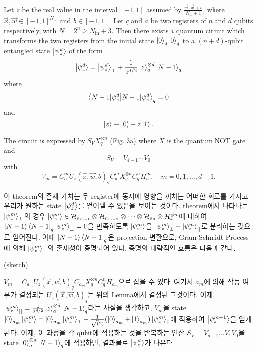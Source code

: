 \begin{theorem}
    
Let $z$ be the real value in the interval $[-1, 1]$ assumed by $\frac{\vec{w} \cdot \vec{x} + b}{N_{\text{in}} + 1}$, where $\vec{x}, \vec{w} \in [-1, 1]^{N_{\text{in}}}$ and $b \in [-1, 1]$. Let $q$ and $a$ be two registers of $n$ and $d$ qubits respectively, with $N = 2^n \geq N_{\text{in}} + 3$. Then there exists a quantum circuit which transforms the two registers from the initial state $\ket{0}_a \ket{0}_q$ to a $(n + d)$-qubit entangled state $\ket{\psi_z^d}$ of the form
\[
\ket{\psi_z^d} = \ket{\psi_z^d}_\perp + \frac{1}{2^{d/2}} \ket{z}_a^{\otimes d} \ket{N - 1}_q
\]
where
\[
\braket{N - 1 | \psi_z^d}_q = 0
\]
and
\[
\ket{z} \equiv \ket{0} + z \ket{1}.
\]

The circuit is expressed by $S_V X^{\otimes n}_q$ (Fig. 3a) where $X$ is the quantum NOT gate and
\[
S_V = V_{d-1} \cdots V_0
\]
with
\[
V_m = C_a^m U_z(\vec{x}, \vec{w}, b)_q C_a^m X_q^{\otimes n} C_q^n H_a^m, \quad m = 0, 1, \ldots, d - 1.
\]
\end{theorem}

이 theorem의 존재 가치는 두 register에 동시에 영향을 끼치는 어떠한 회로를 가지고 우리가 원하는 state \(\ket{\psi_z^d}\)를 얻어낼 수 있음을 보이는 것이다.
theorem에서 나타나는 \(\ket{\psi_z^m}_\perp\)의 경우
\(\ket{\psi_z^m} \in \mathcal{H}_{a_{m-1}} \otimes \mathcal{H}_{a_{m-2}} \otimes \dots \otimes \mathcal{H}_{a_{0}} \otimes \mathcal{H}_{a}^{\otimes n}\)에 대하여
\(\ket{N-1}\bra{N-1}_q\ket{\psi_z^m}_\perp = 0\)을 만족하도록 \(\ket{\psi_z^m}\)을 \(\ket{\psi_z^m}_\perp + \ket{\psi_z^m}_{||}\)로 분리하는 것으로 얻어진다.
이떄 \(\ket{N-1}\bra{N-1}_q\)은 projection 변환으로, Gram-Schmidt Process에 의해 \(\ket{\psi_z^m}_\perp\)의 존재성이 증명되어 있다.
증명의 대략적인 흐름은 다음과 같다.

\begin{pf}(sketch)

    \(V_m = C_{a_m}U_z(\vec{x},\vec{w},b)_qC_{a_m}X_q^{\otimes n}C_q^nH_{a_m}\)으로 잡을 수 있다. 여기서 \(a_m\)에 의해 작동 여부가 결정되는 \(U_z(\vec{x},\vec{w},b)_q\)는 위의 Lemma에서 결정된 그것이다.
    이제, \(\ket{\psi_z^m}_{||} = \frac{1}{2^{d/2}}\ket{z}_a^{\otimes d}\ket{N-1}_q\)라는 사실을 생각하고, \(V_m\)을 state \(\ket{0}_{a_m}\ket{\psi_z^m} = \ket{0}_{a_m}\ket{\psi_z^m}_\perp + \frac{1}{\sqrt(2)}(\ket{0}_{a_m}+\ket{1}_{a_m})\ket{\psi_z^m}_{||}\)에 적용하여
    \(\ket{\psi_z^{m+1}}\)을 얻게 된다. 이제, 이 과정을 각 qubit에 적용하는 것을 반복하는 연산 \(S_V = V_{d-1}\dots V_1V_0\)을 state \(\ket{0}_a^{\otimes d} \ket{N-1}_q\)에 적용하면, 결과물로 \(\ket{\psi_z^d}\)가 나온다.

\end{pf}

